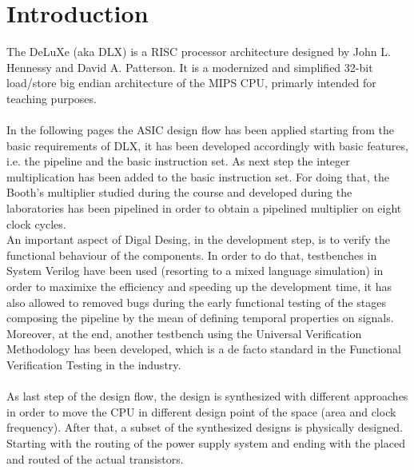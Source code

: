 \chapter{Introduction}
\label{Introduction}
The DeLuXe (aka DLX) is a RISC processor architecture designed by John L. Hennessy and David A. Patterson. It is a modernized and simplified  32-bit load/store big endian architecture of the MIPS CPU, primarly intended for teaching purposes.\\\\
In the following pages the ASIC design flow has been applied starting from the basic requirements of DLX, it has been developed accordingly with basic features, i.e. the pipeline and the basic instruction set.
As next step the integer multiplication has been added to the basic instruction set. For doing that, the Booth's multiplier studied during the course and developed during the laboratories has been pipelined in order to obtain a pipelined multiplier on eight clock cycles.\\
An important aspect of Digal Desing, in the development step, is to verify the functional behaviour of the components. In order to do that, testbenches in System Verilog have been used (resorting to a mixed language simulation) in order to maximixe the efficiency and speeding up the development time, it has also allowed to removed bugs during the early functional testing of the stages composing the pipeline  by the mean of defining temporal properties on signals.
Moreover, at the end, another testbench using the Universal Verification Methodology has been developed, which is a de facto standard in the Functional Verification Testing in the industry\cite{website:1}.\\\\
As last step of the design flow, the design is synthesized with different approaches in order to move the CPU in different design point of the space (area and clock frequency). After that, a subset of the synthesized designs is physically designed. Starting with the routing of the power supply system and ending with the placed and routed of the actual transistors.